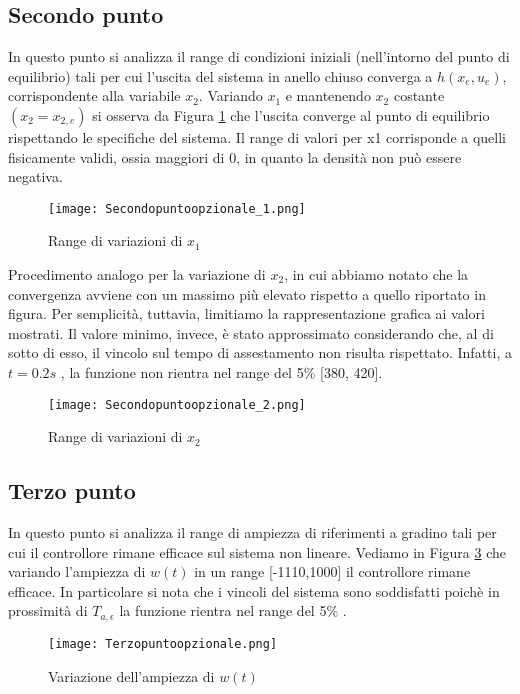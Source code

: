 \documentclass[a4paper, 11pt]{article}
\begin{document}
\clearpage
\subsection{Secondo punto}
In questo punto si analizza il range di condizioni iniziali (nell’intorno del punto di equilibrio) tali per cui l’uscita del sistema in anello chiuso converga a $h(x_e,u_e)$, corrispondente alla variabile $x_2$. Variando $x_1$ e mantenendo $x_2$ costante $(x_2=x_{2,e})$ si osserva da Figura \ref{Figura 16} che l’uscita converge al punto di equilibrio rispettando le specifiche del sistema. Il range di valori per x1 corrisponde a quelli fisicamente validi, ossia maggiori di 0, in quanto la densità non può essere negativa. 
\\
 \begin{figure}[H]
 	\centering
 	\texttt{[image: Secondopuntoopzionale\_1.png]}
 	\caption[]{Range di variazioni di $x_1$}
 	\label{Figura 16}
 \end{figure}
 Procedimento analogo per la variazione di $x_2$, in cui abbiamo notato che la convergenza avviene con un massimo più elevato rispetto a quello riportato in figura. Per semplicità, tuttavia, limitiamo la rappresentazione grafica ai valori mostrati. Il valore minimo, invece, è stato approssimato considerando che, al di sotto di esso, il vincolo sul tempo di assestamento non risulta rispettato. Infatti, a  $t=0.2s$ , la funzione non rientra nel range del 5\% [380, 420].
\begin{figure}[H]
    \centering
    \texttt{[image: Secondopuntoopzionale\_2.png]}
    \caption[]{Range di variazioni di $x_2$}
    \label{Figura 17}
\end{figure}


\subsection{Terzo punto}
In questo punto si analizza il range di ampiezza di riferimenti a gradino tali per cui il controllore rimane efficace sul sistema non lineare.
Vediamo in Figura \ref{Figura 18} che variando l’ampiezza di $w(t)$ in un range [-1110,1000] il controllore rimane efficace. In particolare si nota che i vincoli del sistema sono soddisfatti poichè in prossimità di $T_{a,\epsilon}$ la funzione rientra nel range del 5\% .
\\

\begin{figure}[H]
	\centering
	\texttt{[image: Terzopuntoopzionale.png]}
	\caption[]{Variazione dell'ampiezza di $w(t)$}
	\label{Figura 18}
\end{figure}
\end{document}
